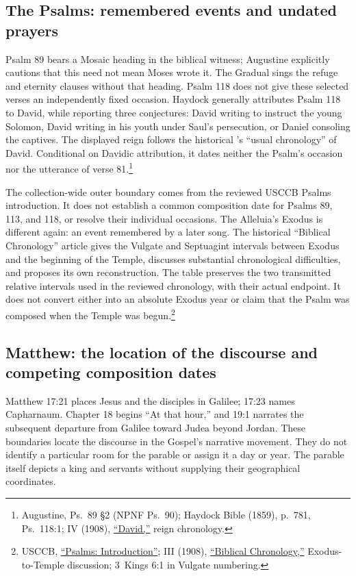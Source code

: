 \subsection{The Psalms: remembered events and undated prayers}
\label{hist-psalms}
Psalm 89 bears a Mosaic heading in the biblical witness; Augustine
explicitly cautions that this need not mean Moses wrote it. The Gradual
sings the refuge and eternity clauses without that heading. Psalm 118
does not give these selected verses an independently fixed occasion.
Haydock generally attributes Psalm 118 to David, while reporting three
conjectures: David writing to instruct the young Solomon, David writing
in his youth under Saul's persecution, or Daniel consoling the captives.
The displayed reign follows the historical 's
``usual chronology'' of David. Conditional on Davidic attribution, it dates
neither the Psalm's occasion nor the utterance of verse 81.\footnote{
Augustine, Ps.~89 \S2 (NPNF Ps.~90); Haydock Bible (1859), p.~781,
Ps.~118:1;  IV (1908),
\href{https://www.newadvent.org/cathen/04642b.htm}{``David,''} reign chronology.}

The collection-wide outer boundary comes from the reviewed USCCB
Psalms introduction. It does not establish a common composition date for
Psalms 89, 113, and 118, or resolve their individual occasions. The
Alleluia's Exodus is different again: an event remembered by a later
song. The historical ``Biblical Chronology'' article gives the Vulgate
and Septuagint intervals between Exodus and the beginning of the Temple,
discusses substantial chronological difficulties, and proposes its own
reconstruction. The table preserves the two transmitted relative
intervals used in the reviewed chronology, with their actual endpoint.
It does not convert either into an absolute Exodus year or claim that
the Psalm was composed when the Temple was begun.\footnote{USCCB,
\href{https://bible.usccb.org/bible/psalms/0}{``Psalms: Introduction''};
 III (1908),
\href{https://www.newadvent.org/cathen/03731a.htm}{``Biblical Chronology,''}
Exodus-to-Temple discussion; 3~Kings 6:1 in Vulgate numbering.}

\subsection{Matthew: the location of the discourse and competing composition dates}
\label{hist-matthew}
Matthew 17:21 places Jesus and the disciples in Galilee; 17:23 names
Capharnaum. Chapter 18 begins ``At that hour,'' and 19:1 narrates the
subsequent departure from Galilee toward Judea beyond Jordan. These
boundaries locate the discourse in the Gospel's narrative movement.
They do not identify a particular room for the parable or assign it a
day or year. The parable itself depicts a king and servants without
supplying their geographical coordinates.

